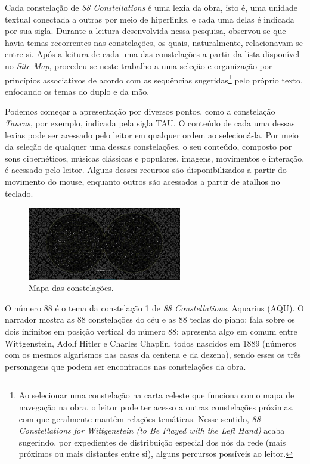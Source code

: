 \documentclass[portuguese]{textolivre}
\begin{document}
Cada constelação de \emph{88 Constellations} é uma lexia da obra, isto é, uma unidade textual conectada a outras por meio de hiperlinks, e cada uma delas é indicada por sua sigla. Durante a leitura desenvolvida nessa pesquisa, observou-se que havia temas recorrentes nas constelações, os quais, naturalmente, relacionavam-se entre si. Após a leitura de cada uma das constelações a partir da lista disponível no \emph{Site Map}, procedeu-se neste trabalho a uma seleção e organização por princípios associativos de acordo com as sequências sugeridas\footnote{Ao selecionar uma constelação na carta celeste que funciona como mapa de navegação na obra, o leitor pode ter acesso a outras constelações próximas, com que geralmente mantêm relações temáticas. Nesse sentido, \emph{88 Constellations for Wittgenstein (to Be Played with the Left Hand)} acaba sugerindo, por expedientes de distribuição especial dos nós da rede (mais próximos ou mais distantes entre si), alguns percursos possíveis ao leitor.} pelo próprio texto, enfocando os temas do duplo e da mão.

Podemos começar a apresentação por diversos pontos, como a constelação \emph{Taurus}, por exemplo, indicada pela sigla TAU. O conteúdo de cada uma dessas lexias pode ser acessado pelo leitor em qualquer ordem ao selecioná-la. Por meio da seleção de qualquer uma dessas constelações, o seu conteúdo, composto por sons cibernéticos, músicas clássicas e populares, imagens, movimentos e interação, é acessado pelo leitor. Alguns desses recursos são disponibilizados a partir do movimento do mouse, enquanto outros são acessados a partir de atalhos no teclado.

\begin{figure}[htbp]
 \centering
 \includegraphics[width=0.6\textwidth]{Fig2[1].jpg}
 \caption{Mapa das constelações.}
 \label{fig2}
\end{figure}

O número 88 é o tema da constelação 1 de \emph{88 Constellations}, Aquarius (AQU). O narrador mostra as 88 constelações do céu e as 88 teclas do piano; fala sobre os dois infinitos em posição vertical do número 88; apresenta algo em comum entre Wittgenstein, Adolf Hitler e Charles Chaplin, todos nascidos em 1889 (números com os mesmos algarismos nas casas da centena e da dezena), sendo esses os três personagens que podem ser encontrados nas constelações da obra. 
\end{document}
